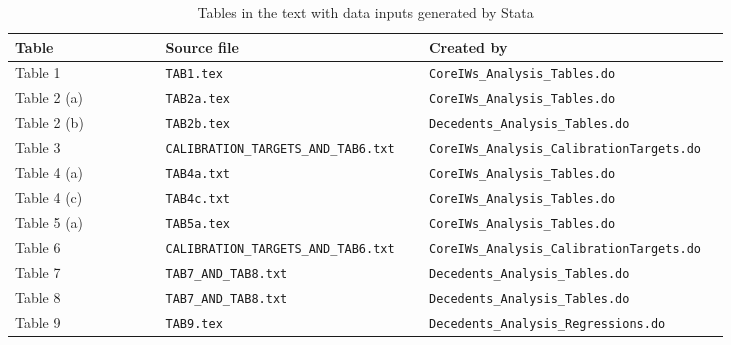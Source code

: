 \documentclass[a4,12p]{article}
\begin{document}
\clearpage

\begin{landscape}
\begin{table}[ht]
\caption{Tables in the text with data inputs generated by Stata \label{Tab:TextTables}}
\begin{tabular}{p{0.20\linewidth} p{0.35\linewidth} p{0.40\linewidth}}
\toprule
Table & Source file & Created by \\
\midrule
Table 1 & {\tt TAB1.tex} & {\tt CoreIWs\_Analysis\_Tables.do}  \\
\midrule
Table 2 (a) & {\tt TAB2a.tex} & {\tt CoreIWs\_Analysis\_Tables.do} \\
Table 2 (b) & {\tt TAB2b.tex} & {\tt Decedents\_Analysis\_Tables.do} \\
\midrule
Table 3 & {\tt CALIBRATION\_TARGETS\_AND\_TAB6.txt} & {\tt CoreIWs\_Analysis\_CalibrationTargets.do} \\
\midrule
Table 4 (a) & {\tt TAB4a.txt} & {\tt CoreIWs\_Analysis\_Tables.do} \\
Table 4 (c) & {\tt TAB4c.txt} & {\tt CoreIWs\_Analysis\_Tables.do} \\
\midrule
Table 5 (a) & {\tt TAB5a.tex}  & {\tt CoreIWs\_Analysis\_Tables.do}  \\
\midrule
Table 6 & {\tt CALIBRATION\_TARGETS\_AND\_TAB6.txt} & {\tt CoreIWs\_Analysis\_CalibrationTargets.do} \\
\midrule
Table 7 & {\tt TAB7\_AND\_TAB8.txt} & {\tt Decedents\_Analysis\_Tables.do} \\
\midrule
Table 8 & {\tt TAB7\_AND\_TAB8.txt} & {\tt Decedents\_Analysis\_Tables.do} \\
\midrule
Table 9 & {\tt TAB9.tex}  & {\tt Decedents\_Analysis\_Regressions.do} \\
\bottomrule
\end{tabular}
\end{table}
\end{landscape}
\end{document}
